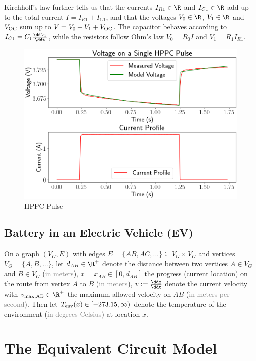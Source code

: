 \documentclass[12pt, a4paper]{article}
\begin{document}
  Kirchhoff's law further tells us that the currents $I_{R1} \in \R$ and $I_{C1} \in \R$ add up to the total current $I = I_{R1} + I_{C1}$, and that the voltages $V_0 \in \R$, $V_1 \in \R$ and $V_{\rm OC}$ sum up to $V = V_0 + V_1 + V_{\rm OC}$.
  The capacitor behaves according to $I_{C1} = C_1 \frac{\dd V_1}{\ddt}$, while the resistors follow Ohm's law $V_0 = R_0 I$ and $V_1 = R_1 I_{R1}$.

  \begin{figure}[H]
    \centering
    \includegraphics[width=0.6\linewidth]{figures/ec2.png}
    \caption{HPPC Pulse}
    \label{fig:ec2}
  \end{figure}

  \subsection{Battery in an Electric Vehicle (EV)}
  On a graph $(V_G, E)$ with edges $E = \{AB, AC, ...\} \subseteq V_G \times V_G$ and vertices $V_G = \{A, B, ...\}$, let
  $d_{AB} \in \R^+$ denote the distance between two vertices $A \in V_G$ and $B \in V_G$ (\textcolor{gray}{in meters}),
  $x = x_{AB} \in [0, d_{AB}]$ the progress (current location) on the route from vertex $A$ to $B$ (\textcolor{gray}{in meters}),
  $v := \frac{\ddx}{\ddt}$ denote the current velocity with
  $v_{\rm max, AB} \in \R^+$ the maximum allowed velocity on $AB$ (\textcolor{gray}{in meters per second}).
  Then let
  $T_{\rm env}(x) \in [-273.15, \infty)$ denote the temperature of the environment (\textcolor{gray}{in degrees Celsius}) at location $x$.

  \section{The Equivalent Circuit Model}
  \begin{figure}[H]
    \centering
  \end{figure}
\end{document}
